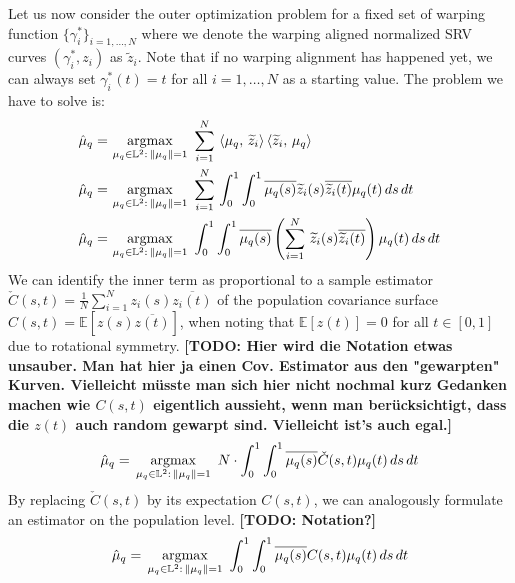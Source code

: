 Let us now consider the outer optimization problem for a fixed set of warping function $\{\gamma_i^*\}_{i=1,\dots,N}$ where we denote the warping aligned normalized SRV curves $(\gamma_i^*, z_i)$ as $\widetilde{z}_i$.
Note that if no warping alignment has happened yet, we can always set $\gamma_i^*(t) = t$ for all $i=1,\dots,N$ as a starting value.
The problem we have to solve is:
\begin{align*}
  \hat\mu_q = &\, \operatorname*{argmax}_{\mu_q \in \mathbb{L}^2:\,\lVert\mu_q\rVert = 1}\,\,
    \sum_{i=1}^N \, \left\langle \mu_q,\, \widetilde z_i \right\rangle \left\langle \widetilde z_i,\, \mu_q \right\rangle \\
  \hat\mu_q = &\, \operatorname*{argmax}_{\mu_q \in \mathbb{L}^2:\,\lVert\mu_q\rVert = 1}\,\,
    \sum_{i=1}^N \, \int_0^1 \int_0^1 \overline{\mu_q (s)} \widetilde z_i(s) \overline{\widetilde z_i(t)} \mu_q(t) \,ds\,dt \\
  \hat\mu_q = &\, \operatorname*{argmax}_{\mu_q \in \mathbb{L}^2:\,\lVert\mu_q\rVert = 1}\,\,
    \int_0^1 \int_0^1 \overline{\mu_q (s)} \left( \sum_{i=1}^N\, \widetilde z_i(s) \overline{ \widetilde z_i(t)} \right) \mu_q(t) \,ds\,dt
\end{align*}
We can identify the inner term as proportional to a sample estimator $\check{C}(s,t) = \frac{1}{N} \sum_{i=1}^N z_i(s) \overline{z_i(t)}$ of the population covariance surface $C(s,t) = \mathbb{E}[z(s) \overline{z(t)}]$, when noting that $\mathbb{E}[z(t)] = 0$ for all $t \in [0,1]$ due to rotational symmetry.
\textbf{[TODO: Hier wird die Notation etwas unsauber. Man hat hier ja einen Cov. Estimator aus den "gewarpten" Kurven. Vielleicht müsste man sich hier nicht nochmal kurz Gedanken machen wie $C(s,t)$ eigentlich aussieht, wenn man berücksichtigt, dass die $z(t)$ auch random gewarpt sind. Vielleicht ist's auch egal.]}
$$ \hat\mu_q = \, \operatorname*{argmax}_{\mu_q \in \mathbb{L}^2:\,\lVert\mu_q\rVert = 1}\,\,
    N\cdot\int_0^1 \int_0^1 \overline{\mu_q (s)} \check C(s,t) \mu_q(t) \,ds\,dt $$
By replacing $\check C(s,t)$ by its expectation $C(s,t)$, we can analogously formulate an estimator on the population level.
\textbf{[TODO: Notation?]}
$$ \hat\mu_q = \, \operatorname*{argmax}_{\mu_q \in \mathbb{L}^2:\,\lVert\mu_q\rVert = 1}\,\,
    \int_0^1 \int_0^1 \overline{\mu_q (s)} C(s,t) \mu_q(t) \,ds\,dt $$

